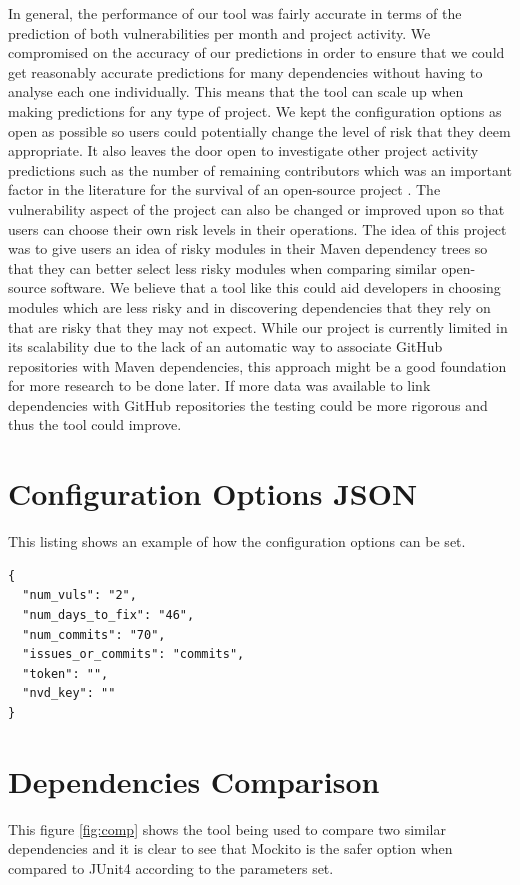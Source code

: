 \documentclass[conference]{IEEEtran}
\begin{document}
In general, the performance of our tool was fairly accurate in terms of the prediction of both vulnerabilities per month and project activity. We compromised on the accuracy of our predictions in order to ensure that we could get reasonably accurate predictions for many dependencies without having to analyse each one individually. This means that the tool can scale up when making predictions for any type of project. We kept the configuration options as open as possible so users could potentially change the level of risk that they deem appropriate. It also leaves the door open to investigate other project activity predictions such as the number of remaining contributors which was an important factor in the literature for the survival of an open-source project \cite{l_bao_large_2021}. The vulnerability aspect of the project can also be changed or improved upon so that users can choose their own risk levels in their operations. The idea of this project was to give users an idea of risky modules in their Maven dependency trees so that they can better select less risky modules when comparing similar open-source software. We believe that a tool like this could aid developers in choosing modules which are less risky and in discovering dependencies that they rely on that are risky that they may not expect. While our project is currently limited in its scalability due to the lack of an automatic way to associate GitHub repositories with Maven dependencies, this approach might be a good foundation for more research to be done later. If more data was available to link dependencies with GitHub repositories the testing could be more rigorous and thus the tool could improve. 



\appendices

\section{Configuration Options JSON}
This listing shows an example of how the configuration options can be set. 

\begin{lstlisting}[caption=Configuration Options]
{
  "num_vuls": "2",
  "num_days_to_fix": "46",
  "num_commits": "70",
  "issues_or_commits": "commits",
  "token": "",
  "nvd_key": ""
}
\end{lstlisting}

\section{Dependencies Comparison}
This figure \ref{fig:comp} shows the tool being used to compare two similar dependencies and it is clear to see that Mockito is the safer option when compared to JUnit4 according to the parameters set. 
\end{document}
